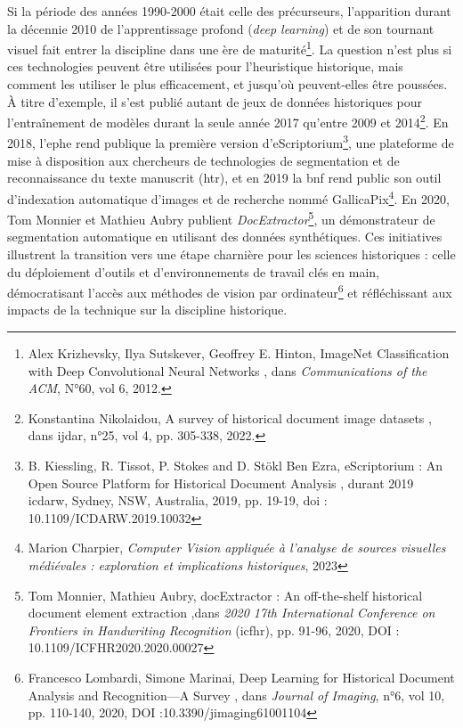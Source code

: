 Si la période des années 1990-2000 était celle des précurseurs, l’apparition durant la décennie 2010 de l’apprentissage profond (\textit{deep learning}) et de son tournant visuel fait entrer la discipline dans une ère de maturité\footnote{Alex Krizhevsky, Ilya Sutskever, Geoffrey E. Hinton, \og ImageNet Classification with Deep Convolutional Neural Networks \fg, dans \textit{Communications of the ACM}, N°60, vol 6, 2012.}. La question n’est plus si ces technologies peuvent être utilisées pour l’heuristique historique, mais comment les utiliser le plus efficacement, et jusqu’où peuvent-elles être poussées. À titre d'exemple, il s'est publié autant de jeux de données historiques pour l’entraînement de modèles durant la seule année 2017 qu’entre 2009 et 2014\footnote{Konstantina Nikolaidou, \og A survey of historical document image datasets \fg, dans \gls{ijdar}, n°25, vol 4, pp. 305-338, 2022.}. En 2018, l’\gls{ephe} rend publique la première version d’eScriptorium\footnote{B. Kiessling, R. Tissot, P. Stokes and D. Stökl Ben Ezra, \og eScriptorium : An Open Source Platform for Historical Document Analysis \fg, durant 2019 \gls{icdarw}, Sydney, NSW, Australia, 2019, pp. 19-19, doi : 10.1109/ICDARW.2019.10032}, une plateforme de mise à disposition aux chercheurs de technologies de segmentation et de reconnaissance du texte manuscrit (\gls{htr}), et en 2019 la \gls{bnf} rend public son outil d’indexation automatique d’images et de recherche nommé GallicaPix\footnote{Marion Charpier, \textit{Computer Vision appliquée à l’analyse de sources visuelles médiévales : exploration et implications historiques}, 2023}. En 2020, Tom Monnier et Mathieu Aubry publient \textit{DocExtractor}\footnote{Tom Monnier, Mathieu Aubry, \og docExtractor : An off-the-shelf historical document element extraction \fg,dans \textit{2020 17th International Conference on Frontiers in Handwriting Recognition} (\gls{icfhr}), pp. 91-96, 2020, DOI : 10.1109/ICFHR2020.2020.00027}, un démonstrateur de segmentation automatique en utilisant des données synthétiques. Ces initiatives illustrent la transition vers une étape charnière pour les sciences historiques : celle du déploiement d’outils et d’environnements de travail clés en main, démocratisant l’accès aux méthodes de vision par ordinateur\footnote{Francesco Lombardi, Simone Marinai, \og Deep Learning for Historical Document Analysis and Recognition—A Survey \fg, dans \textit{Journal of Imaging}, n°6, vol 10, pp. 110-140, 2020, DOI :10.3390/jimaging61001104} et réfléchissant aux impacts de la technique sur la discipline historique.


